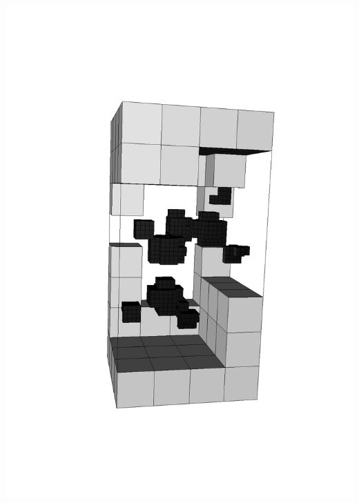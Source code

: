 \begin{frame}
\begin{minipage}{0.5\textwidth}
\includegraphics[angle=-90, scale=0.25, viewport = 170 150 470 700, clip]{figures/methyloxirane_grid.pdf}
\end{minipage}

\vspace{5mm}


\end{frame}
